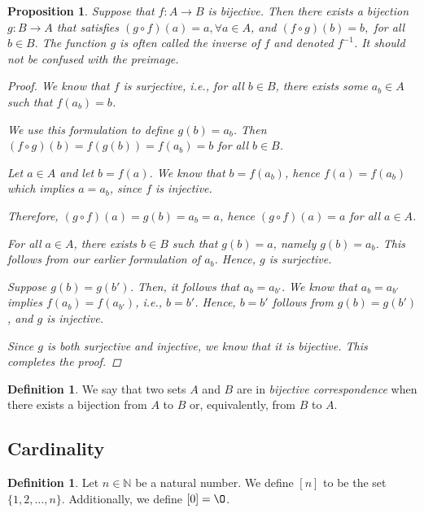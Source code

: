 \documentclass[11pt]{article}
\renewcommand{\emptyset}{\O}
\newtheorem{proposition}[theorem]{Proposition}
\theoremstyle{definition}
\newtheorem{definition}[theorem]{Definition}
\numberwithin{equation}{subsection}
\begin{document}
\begin{proposition} 
Suppose that $f \colon A \rightarrow B$ is bijective.  
Then there exists a bijection $g \colon B \rightarrow A$ that satisfies $(g\circ f)(a)=a, \forall a\in A$, and $(f\circ g)(b)=b,$ for all $b\in B.$ 
The function $g$ is often called the \emph{inverse} of $f$ and  denoted $f^{-1}$. It should not be confused with the preimage. 
\begin{proof}

We know that $f$ is surjective, i.e., for all $b \in B$, there exists some $a_b \in A$ such that $f(a_b)=b$.

We use this formulation to define $g(b)=a_b$. Then $(f\circ g)(b)=f(g(b))=f(a_b)=b$ for all $b \in B$. 

Let $a \in A$ and let $b =f(a)$. We know that $b = f(a_b)$, hence $f(a)=f(a_b)$ which implies $a = a_b$, since $f$ is injective.

Therefore, $(g \circ f)(a)=g(b)=a_b=a$, hence $(g \circ f)(a)=a$ for all $a \in A$.

For all $a \in A$, there exists $b \in B$ such that $g(b)=a$, namely $g(b)=a_b$. This follows from our earlier formulation of $a_b$. Hence, $g$ is surjective.

Suppose $g(b)=g(b')$. Then, it follows that $a_b=a_{b'}$. We know that $a_b=a_{b'}$ implies $f(a_b)=f(a_{b'})$, i.e., $b=b'$. Hence, $b=b'$ follows from $g(b)=g(b')$, and $g$ is injective.

Since $g$ is both surjective and injective, we know that it is bijective. This completes the proof.


\renewcommand\qedsymbol{QED}
\end{proof}

\end{proposition}



\begin{definition}
We say that two sets $A$ and $B$ are in \emph{bijective correspondence} when there exists a bijection from $A$ to $B$ or, equivalently, from $B$ to $A$.
\end{definition}




\subsection*{Cardinality}

\begin{definition}  
Let $n \in \mathbb{N}$ be a natural number.  We define $[n]$ to be the set $\{1, 2, \dotsc, n \}$.  
Additionally, we define $[0]=\emptyset$.
\end{definition}
\end{document}
